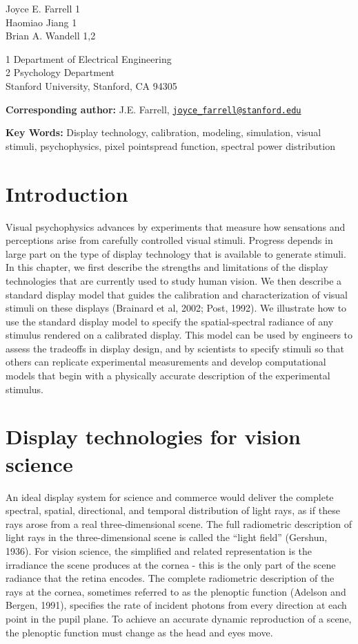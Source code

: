 \documentclass[
  letterpaper,
]{book}
\begin{document}
Joyce E. Farrell 1\\
Haomiao Jiang 1\\
Brian A. Wandell 1,2

1 Department of Electrical Engineering\\
2 Psychology Department\\
Stanford University, Stanford, CA 94305

\textbf{Corresponding author:} J.E. Farrell,
\href{mailto:joyce_farrell@stanford.edu}{\nolinkurl{joyce\_farrell@stanford.edu}}

\textbf{Key Words:} Display technology, calibration, modeling,
simulation, visual stimuli, psychophysics, pixel pointspread function,
spectral power distribution

\section{Introduction}\label{introduction}

Visual psychophysics advances by experiments that measure how sensations
and perceptions arise from carefully controlled visual stimuli. Progress
depends in large part on the type of display technology that is
available to generate stimuli. In this chapter, we first describe the
strengths and limitations of the display technologies that are currently
used to study human vision. We then describe a standard display model
that guides the calibration and characterization of visual stimuli on
these displays (Brainard et al, 2002; Post, 1992). We illustrate how to
use the standard display model to specify the spatial-spectral radiance
of any stimulus rendered on a calibrated display. This model can be used
by engineers to assess the tradeoffs in display design, and by
scientists to specify stimuli so that others can replicate experimental
measurements and develop computational models that begin with a
physically accurate description of the experimental stimulus.

\section{Display technologies for vision
science}\label{display-technologies-for-vision-science}

An ideal display system for science and commerce would deliver the
complete spectral, spatial, directional, and temporal distribution of
light rays, as if these rays arose from a real three-dimensional scene.
The full radiometric description of light rays in the three-dimensional
scene is called the ``light field'' (Gershun, 1936). For vision science,
the simplified and related representation is the irradiance the scene
produces at the cornea - this is the only part of the scene radiance
that the retina encodes. The complete radiometric description of the
rays at the cornea, sometimes referred to as the plenoptic function
(Adelson and Bergen, 1991), specifies the rate of incident photons from
every direction at each point in the pupil plane. To achieve an accurate
dynamic reproduction of a scene, the plenoptic function must change as
the head and eyes move.
\end{document}
